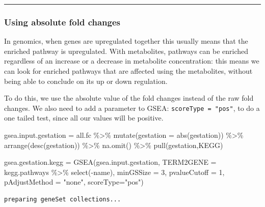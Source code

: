 \documentclass[
  24px,
  letterpaper,
  DIV=11,
  numbers=noendperiod]{scrartcl}
\newenvironment{Shaded}{\begin{snugshade}}{\end{snugshade}}
\newcommand{\AttributeTok}[1]{\textcolor[rgb]{0.40,0.45,0.13}{#1}}
\newcommand{\DecValTok}[1]{\textcolor[rgb]{0.68,0.00,0.00}{#1}}
\newcommand{\FunctionTok}[1]{\textcolor[rgb]{0.28,0.35,0.67}{#1}}
\newcommand{\NormalTok}[1]{\textcolor[rgb]{0.00,0.23,0.31}{#1}}
\newcommand{\OtherTok}[1]{\textcolor[rgb]{0.00,0.23,0.31}{#1}}
\newcommand{\SpecialCharTok}[1]{\textcolor[rgb]{0.37,0.37,0.37}{#1}}
\newcommand{\StringTok}[1]{\textcolor[rgb]{0.13,0.47,0.30}{#1}}
\begin{document}
\begin{center}\rule{0.5\linewidth}{0.5pt}\end{center}

\hypertarget{using-absolute-fold-changes}{%
\subsubsection{Using absolute fold
changes}\label{using-absolute-fold-changes}}

In genomics, when genes are upregulated together this usually means that
the enriched pathway is upregulated. With metabolites, pathways can be
enriched regardless of an increase or a decrease in metabolite
concentration: this means we can look for enriched pathways that are
affected using the metabolites, without being able to conclude on its up
or down regulation.

To do this, we use the absolute value of the fold changes instead of the
raw fold changes. We also need to add a parameter to GSEA:
\texttt{scoreType\ =\ "pos"}, to do a one tailed test, since all our
values will be positive.

\begin{Shaded}
\begin{Highlighting}[]
\NormalTok{gsea.input.gestation }\OtherTok{=}\NormalTok{ all.fc }\SpecialCharTok{\%\textgreater{}\%}
  \FunctionTok{mutate}\NormalTok{(}\AttributeTok{gestation =} \FunctionTok{abs}\NormalTok{(gestation)) }\SpecialCharTok{\%\textgreater{}\%} 
  \FunctionTok{arrange}\NormalTok{(}\FunctionTok{desc}\NormalTok{(gestation)) }\SpecialCharTok{\%\textgreater{}\%} 
  \FunctionTok{na.omit}\NormalTok{() }\SpecialCharTok{\%\textgreater{}\%}
  \FunctionTok{pull}\NormalTok{(gestation,KEGG) }

\NormalTok{gsea.gestation.kegg }\OtherTok{=} \FunctionTok{GSEA}\NormalTok{(gsea.input.gestation, }
                           \AttributeTok{TERM2GENE =}\NormalTok{ kegg.pathways }\SpecialCharTok{\%\textgreater{}\%} \FunctionTok{select}\NormalTok{(}\SpecialCharTok{{-}}\NormalTok{name),}
                           \AttributeTok{minGSSize =} \DecValTok{3}\NormalTok{, }\AttributeTok{pvalueCutoff =} \DecValTok{1}\NormalTok{,}
                           \AttributeTok{pAdjustMethod =} \StringTok{"none"}\NormalTok{, }
                           \AttributeTok{scoreType=}\StringTok{"pos"}\NormalTok{)}
\end{Highlighting}
\end{Shaded}

\begin{verbatim}
preparing geneSet collections...
\end{verbatim}
\end{document}
